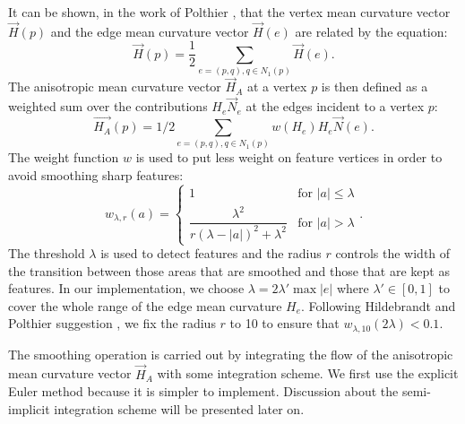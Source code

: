 \documentclass[11pt]{article}
\begin{document}
It can be shown, in the work of Polthier \cite{PolthierHabilitation}, that the vertex mean curvature vector $\vec{H}(p)$ and the edge mean curvature vector $\vec{H}(e)$ are related by the equation:
\begin{equation}
\vec{H}(p) = \frac{1}{2}\sum\limits_{e = (p, q), q \in N_1(p)}\vec{H}(e).
\end{equation}
The anisotropic mean curvature vector $\vec{H}_A$ at a vertex $p$ is then defined as a weighted sum over the contributions $H_e\vec{N}_e$ at the edges incident to a vertex $p$:
\begin{equation}
\vec{H_A}(p) = 1/2\sum\limits_{e = (p, q), q \in N_1(p)}{w(H_e)H_e \vec{N}(e)}.
\label{eq:aniso}
\end{equation}
The weight function $w$ is used to put less weight on feature vertices in order to avoid smoothing sharp features:
\begin{equation}
w_{\lambda, r}(a) = 
\begin{cases}
1 & \text{for } |a| \leq \lambda \\
\dfrac{\lambda^2}{r(\lambda - |a|)^2+\lambda^2} & \text{for } |a| > \lambda
\end{cases}.
\end{equation}
The threshold $\lambda$ is used to detect features and the radius $r$ controls the width of the transition between those areas that are smoothed and those that are kept as features. In our implementation, we choose $\lambda = 2 \lambda' \max |e| $ where $\lambda' \in \left[ 0, 1 \right] $ to cover the whole range of the edge mean curvature $H_e$. Following Hildebrandt and Polthier suggestion \cite{Hildebrandt04anisotropicfiltering}, we fix the radius $r$ to 10 to ensure that $w_{\lambda, 10}(2\lambda) < 0.1$.

The smoothing operation is carried out by integrating the flow of the anisotropic mean curvature vector $\vec{H}_A$ with some integration scheme. We first use the explicit Euler method because it is simpler to implement. Discussion about the semi-implicit integration scheme will be presented later on.
\end{document}
